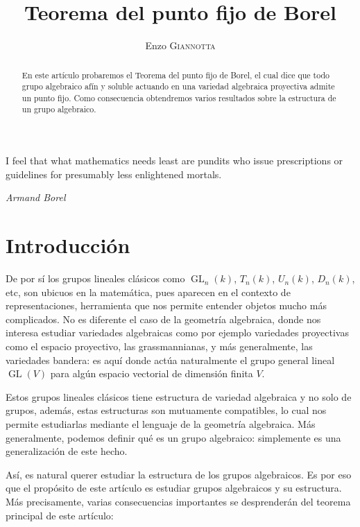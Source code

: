 \documentclass[spanish,10pt]{amsart}
\theoremstyle{definition}
\theoremstyle{remark}
\numberwithin{equation}{section}
\begin{document}
\title{Teorema del punto fijo de Borel}

\author{Enzo \textsc{Giannotta}}





\begin{abstract}
En este artículo probaremos el Teorema del punto fijo de Borel, el cual dice que todo grupo algebraico afín y soluble actuando en una variedad algebraica proyectiva admite un punto fijo. Como consecuencia obtendremos varios resultados sobre la estructura de un grupo algebraico.
\end{abstract}

\maketitle

\tableofcontents

\epigraph{I feel that what mathematics needs least are pundits who issue prescriptions or guidelines for presumably less enlightened mortals.}{\textit{Armand Borel}}

\section{Introducción}


De por sí los grupos lineales clásicos como $\operatorname{GL}_n (k)$, $T_n (k)$, $U_n (k)$, $D_n (k)$, etc, son ubicuos en la matemática, pues aparecen en el contexto de representaciones, herramienta que nos permite entender objetos mucho más complicados. No es diferente el caso de la geometría algebraica, donde nos interesa estudiar variedades algebraicas como por ejemplo variedades proyectivas como el espacio proyectivo, las grassmannianas, y más generalmente, las variedades bandera: es aquí donde actúa naturalmente el grupo general lineal $\operatorname{GL} (V)$ para algún espacio vectorial de dimensión finita $V$.

Estos grupos lineales clásicos tiene estructura de variedad algebraica y no solo de grupos, además, estas estructuras son mutuamente compatibles, lo cual nos permite estudiarlas mediante el lenguaje de la geometría algebraica. Más generalmente, podemos definir qué es un grupo algebraico: simplemente es una generalización de este hecho.

Así, es natural querer estudiar la estructura de los grupos algebraicos. Es por eso que el propósito de este artículo es estudiar grupos algebraicos y su estructura. Más precisamente, varias consecuencias importantes se desprenderán del teorema principal de este artículo:
\end{document}
